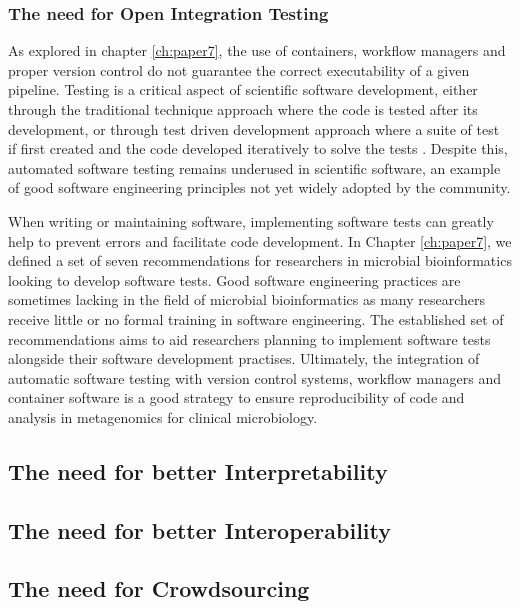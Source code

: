 \subsubsection{The need for Open Integration Testing }

As explored in chapter \ref{ch:paper7}, the use of containers, workflow managers and proper version control do not guarantee the correct executability of a given pipeline. Testing is a critical aspect of scientific software development, either through the traditional technique approach where the code is tested after its development, or through test driven development approach where a suite of test if first created and the code developed iteratively to solve the tests \citep{krafczyk_scientific_2019}. Despite this, automated software testing remains underused in scientific software, an example of good software engineering principles not yet widely adopted by the community. 

When writing or maintaining software, implementing software tests can greatly help to prevent errors and facilitate code development. In Chapter \ref{ch:paper7}, we defined a set of seven recommendations for researchers in microbial bioinformatics looking to develop software tests. Good software engineering practices are sometimes lacking in the field of microbial bioinformatics as many researchers receive little or no formal training in software engineering. The established set of recommendations aims to aid researchers planning to implement software tests alongside their software development practises. Ultimately, the integration of automatic software testing with version control systems, workflow managers and container software is a good strategy to ensure reproducibility of code and analysis in metagenomics for clinical microbiology. 

\subsection{The need for better Interpretability}

\subsection{The need for better Interoperability}

\subsection{The need for Crowdsourcing}